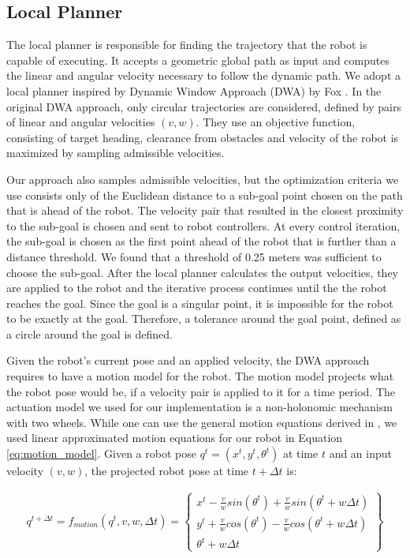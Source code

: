 \subsection{Local Planner}
\label{sec:navigation_local_planner}

The local planner is responsible for finding the trajectory that the robot is capable of executing. It accepts a geometric global path as input and computes the linear and angular velocity necessary to follow the dynamic path. We adopt a local planner inspired by Dynamic Window Approach (DWA) by Fox \cite{fox1997dynamic}. In the original DWA approach, only circular trajectories are considered, defined by pairs of linear and angular velocities $(v,w)$. They use an objective function, consisting of target heading, clearance from obstacles and velocity of the robot is maximized by sampling admissible velocities.

Our approach also samples admissible velocities, but the optimization criteria we use consists only of the Euclidean distance to a sub-goal point chosen on the path that is ahead of the robot. The velocity pair that resulted in the closest proximity to the sub-goal is chosen and sent to robot controllers. At every control iteration, the sub-goal is chosen as the first point ahead of the robot that is further than a distance threshold. We found that a threshold of 0.25 meters was sufficient to choose the sub-goal. After the local planner calculates the output velocities, they are applied to the robot and the iterative process continues until the the robot reaches the goal. Since the goal is a singular point, it is impossible for the robot to be exactly at the goal. Therefore, a tolerance around the goal point, defined as a circle around the goal is defined.

Given the robot's current pose and an applied velocity, the DWA approach requires to have a motion model for the robot. The motion model projects what the robot pose would be, if a velocity pair is applied to it for a time period. The actuation model we used for our implementation is a non-holonomic mechanism with two wheels. While one can use the general motion equations derived in \cite{fox1997dynamic}, we used linear approximated motion equations for our robot in Equation \ref{eq:motion_model}. Given a robot pose $q^t=(x^t,y^t,\theta^t)$ at time $t$ and an input velocity $(v,w)$, the projected robot pose at time $t+\Delta t$ is:

\begin{align}
q^{t+\Delta t} = 
f_{motion}(q^t,v,w,\Delta t) =
\begin{Bmatrix}
x^t-\frac{v}{w}sin(\theta^t)+\frac{v}{w}sin(\theta^t+w \Delta t)\\
y^t+\frac{v}{w}cos(\theta^t)-\frac{v}{w}cos(\theta^t+w \Delta t)\\
\theta^t + w\Delta t
\end{Bmatrix}
\label{eq:motion_model}
\end{align}



